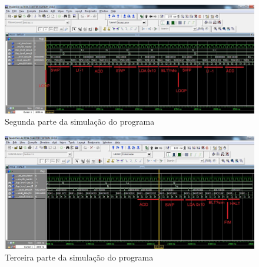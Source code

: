 \documentclass[../main.tex]{subfiles}
\begin{document}
	\begin{figure}[h]
		\centering
		\includegraphics[width=\textwidth]{img/programa_p2}
		\caption{Segunda parte da simulação do programa}
		\label{fig:sim2}
	\end{figure}
		
	\begin{figure}[h]
		\centering
		\includegraphics[width=\textwidth]{img/programa_p3}
		\caption{Terceira parte da simulação do programa}
		\label{fig:sim3}
	\end{figure}
\end{document}
